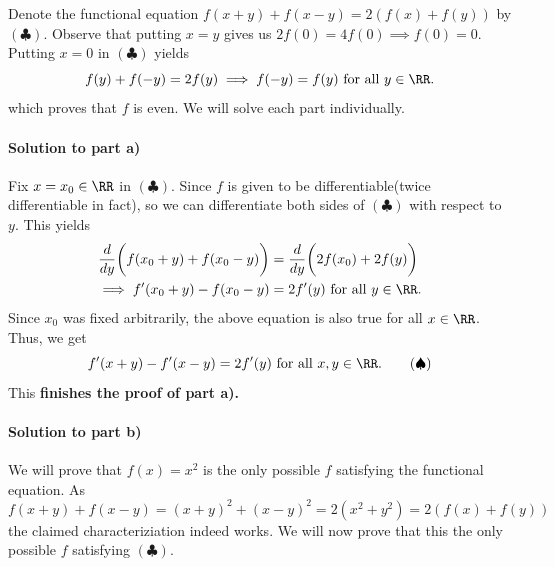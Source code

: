 \documentclass[numbers=endperiod, 11pt]{scrartcl}
\begin{document}
\begin{sol}
    Denote the functional equation
    $f(x + y) + f(x - y) = 2\left(f(x) + f(y)\right)$ by
    $(\clubsuit)$.
    Observe that putting $x = y$ gives us
    $2f(0) = 4f(0) \implies f(0) = 0$. Putting $x = 0$
    in $(\clubsuit)$ yields
    \[ f(y) + f(-y) = 2f(y) \implies f(-y) = f(y)\,\, \text{for all\,\,} y \in \RR.\]
    which proves that $f$ is even. We will solve each part
    individually.

    \paragraph{Solution to part a)} Fix $x = x_0 \in \RR$
    in $(\clubsuit)$. Since $f$ is given to be
    differentiable(twice differentiable in fact), so we can
    differentiate both sides of $(\clubsuit)$ with respect
    to $y$. This yields
    \begin{align*}
        \frac{d}{dy} \bigg( f(x_0+y) + f(x_0-y) \bigg) & = \frac{d}{dy} \bigg(2f(x_0) + 2f(y)\bigg) \\
        \implies f'(x_0 + y) - f(x_0 - y)              & = 2f'(y)\,\, \text{for all $y \in \RR$.}
    \end{align*}
    Since $x_0$ was fixed arbitrarily, the above equation is
    also true for all $x \in \RR$. Thus, we get
    \[f'(x + y) - f'(x - y) = 2f'(y) \text{ for all } x, y \in \RR. \tag{$\spadesuit$} \label{q4-a}\]
    This \textbf{finishes the proof of part a).} \bsquare

    \paragraph{Solution to part b)} We will prove that
    $f(x) = x^2$ is the only possible $f$ satisfying
    the functional equation. As
    \[f(x+y) + f(x-y) = (x+y)^2 + (x-y)^2 = 2(x^2 + y^2) = 2\left(f(x) + f(y)\right) \]
    the claimed characteriziation indeed works. We will now
    prove that this the only possible $f$ satisfying
    $(\clubsuit)$.


\end{sol}
\end{document}
